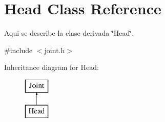 \hypertarget{class_head}{\section{Head Class Reference}
\label{class_head}
}


Aqui se describe la clase derivada \char`\"{}\-Head\char`\"{}.  




{\ttfamily \#include $<$joint.\-h$>$}

Inheritance diagram for Head\-:\begin{figure}[H]
\begin{center}
\leavevmode
\includegraphics[height=2.000000cm]{class_head}
\end{center}
\end{figure}
